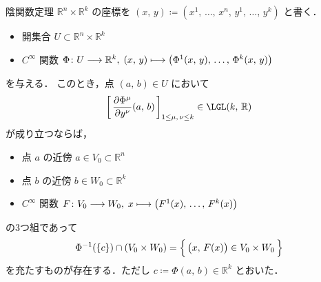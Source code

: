 \documentclass[geometry_main]{subfiles}
\begin{document}
\begin{mycol}[label=col:implicit]{陰関数定理}
    $\mathbb{R}^n \times \mathbb{R}^k$ の座標を $(x,\, y) \coloneqq (x^1,\, \dots,\, x^n,\, y^1,\, \dots,\, y^k)$ と書く．
    \begin{itemize}
        \item 開集合 $U \subset \mathbb{R}^n \times \mathbb{R}^k$
        \item $C^\infty$ 関数 $\Phi \colon U \longrightarrow \mathbb{R}^k,\; (x,\, y) \longmapsto \bigl( \Phi^1(x,\, y),\, \dots,\, \Phi^k(x,\, y) \bigr) $
    \end{itemize}
    を与える．
    このとき，点 $(a,\, b) \in U$ において
    \begin{align}
        \left[\, \pdv{\Phi^\mu}{y^\nu}()(a,\, b) \,\right]_{1 \le \mu,\, \nu \le k} \in \LGL(k,\, \mathbb{R})
    \end{align}
    が成り立つならば，
    \begin{itemize}
        \item 点 $a$ の近傍 $a \in V_0 \subset \mathbb{R}^n$
        \item 点 $b$ の近傍 $b \in W_0 \subset \mathbb{R}^k$ 
        \item $C^\infty$ 関数 $F \colon V_0 \longrightarrow W_0,\; x \longmapsto \bigl( F^1(x),\, \dots,\, F^k(x) \bigr)$
    \end{itemize}
    の3つ組であって
    \begin{align}
        \Phi^{-1}(\{c\}) \cap (V_0 \times W_0) = \Bigl\{\, \bigl( x,\, F(x) \bigr) \in V_0 \times W_0 \,\Bigr\} 
    \end{align}
    を充たすものが存在する．ただし $c \coloneqq \Phi(a,\, b) \in \mathbb{R}^k$ とおいた．
\end{mycol}
\end{document}
